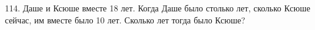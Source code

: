 114. Даше и Ксюше вместе 18 лет. Когда Даше было столько лет, сколько Ксюше сейчас, им вместе было 10 лет. Сколько лет тогда было Ксюше?\\
